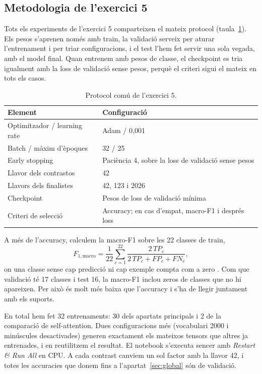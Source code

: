 \documentclass[11pt,a4paper]{article}
\begin{document}
\subsection{Metodologia de l'exercici 5}
\label{sec:metodologia}

Tots els experiments de l'exercici 5 comparteixen el mateix protocol (taula~\ref{tab:protocol}). Els pesos
s'aprenen només amb train, la validació serveix per aturar l'entrenament i per triar configuracions, i el test
l'hem fet servir una sola vegada, amb el model final. Quan entrenem amb pesos de classe, el checkpoint es tria
igualment amb la loss de validació sense pesos, perquè el criteri sigui el mateix en tots els casos.

\begin{table}[ht]
\centering\small
\caption{Protocol comú de l'exercici 5.}
\label{tab:protocol}
\begin{tabular}{ll}
\toprule
Element & Configuració\\
\midrule
Optimitzador / learning rate & Adam / 0,001\\
Batch / màxim d'èpoques & 32 / 25\\
Early stopping & Paciència 4, sobre la loss de validació sense pesos\\
Llavor dels contrastos & 42\\
Llavors dels finalistes & 42, 123 i 2026\\
Checkpoint & Pesos de loss de validació mínima\\
Criteri de selecció & Accuracy; en cas d'empat, macro-F1 i després loss\\
\bottomrule
\end{tabular}
\end{table}

A més de l'accuracy, calculem la macro-F1 sobre les 22 classes de train,
\[
  F_{1,\mathrm{macro}}=\frac{1}{22}\sum_{c=1}^{22}\frac{2\,TP_c}{2\,TP_c+FP_c+FN_c},
\]
on una classe sense cap predicció ni cap exemple compta com a zero \citep{f1}. Com que validació té 17 classes i
test 16, la macro-F1 inclou zeros de classes que no hi apareixen. Per això és molt més baixa que l'accuracy i s'ha
de llegir juntament amb els suports.

En total hem fet 32 entrenaments: 30 dels apartats principals i 2 de la comparació de self-attention. Dues
configuracions més (vocabulari 2000 i minúscules desactivades) generen exactament els mateixos tensors que altres
ja entrenades, i en reutilitzem el resultat. El notebook s'executa sencer amb \emph{Restart \& Run All} en CPU.
A cada contrast canviem un sol factor amb la llavor 42, i totes les accuracies que donem fins a
l'apartat~\ref{sec:global} són de validació.
\end{document}
